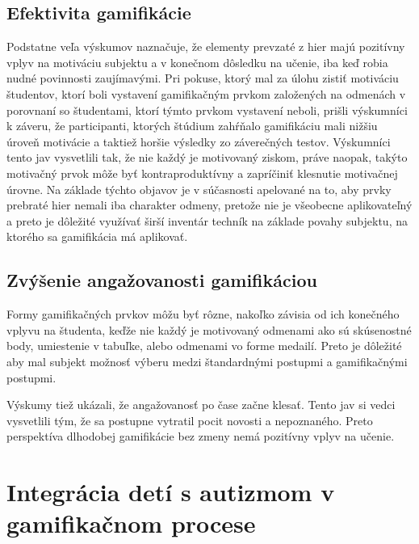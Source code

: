 \documentclass[10pt,twoside,slovak,a4paper]{coursepaper}
\begin{document}
\subsection{Efektivita gamifikácie} \label{Efektivita gamifikácie}
Podstatne veľa výskumov naznačuje, že elementy prevzaté z hier majú pozitívny vplyv na motiváciu subjektu a v konečnom dôsledku na učenie, iba keď robia nudné povinnosti zaujímavými.\cite{review_of_issues} Pri pokuse, ktorý mal za úlohu zistiť motiváciu študentov, ktorí boli vystavení gamifikačným prvkom založených na odmenách v porovnaní so študentami, ktorí týmto prvkom vystavení neboli, prišli výskumníci k záveru, že participanti, ktorých štúdium zahŕňalo gamifikáciu mali nižšiu úroveň motivácie a taktiež horšie výsledky zo záverečných testov.\cite{Hanus2015AssessingTE} Výskumníci tento jav vysvetlili tak, že nie každý je motivovaný ziskom, práve naopak, takýto motivačný prvok môže byť kontraproduktívny a zapríčiniť klesnutie motivačnej úrovne. Na základe týchto objavov je v súčasnosti apelované na to, aby prvky prebraté hier nemali iba charakter odmeny, pretože nie je všeobecne aplikovateľný a preto je dôležité využívať širší inventár techník na základe povahy subjektu, na ktorého sa gamifikácia má aplikovať. \cite{Hanus2015AssessingTE}


\subsection{Zvýšenie angažovanosti gamifikáciou} \label{Zvýšenie angažovanosti gamifikáciou}
Formy gamifikačných prvkov môžu byť rôzne, nakoľko závisia od ich konečného vplyvu na študenta, keďže nie každý je motivovaný odmenami ako sú skúsenostné body, umiestenie v tabuľke, alebo odmenami vo forme medailí. Preto je dôležité aby mal subjekt možnosť výberu medzi štandardnými postupmi a gamifikačnými postupmi.\cite{article_engagment}

Výskumy tiež ukázali, že angažovanosť po čase začne klesať. Tento jav si vedci vysvetlili tým, že sa postupne vytratil pocit novosti a nepoznaného. Preto perspektíva dlhodobej gamifikácie bez zmeny nemá pozitívny vplyv na učenie.\cite{gamification_effectivness}


\section{Integrácia detí s autizmom v gamifikačnom procese} \label{Integrácia detí s autizmom v gamifikačnom procese}
\end{document}
